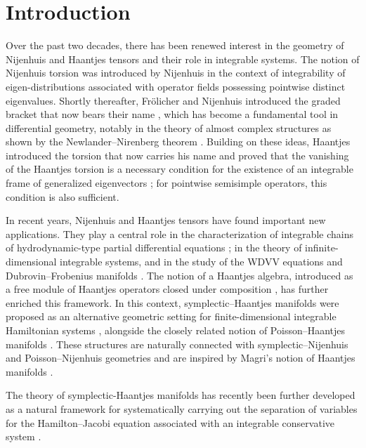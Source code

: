 \documentclass[10pt]{amsart}
\numberwithin{equation}{section}
\theoremstyle{definition}
\begin{document}
\tableofcontents



\section{Introduction}
\label{introduction}

Over the past two decades, there has been renewed interest in the geometry of Nijenhuis and Haantjes tensors and their role in integrable systems. The notion of Nijenhuis torsion was introduced by Nijenhuis \cite{Nij1951} in the context of integrability of eigen-distributions associated with operator fields possessing pointwise distinct eigenvalues. Shortly thereafter, Frölicher and Nijenhuis introduced the graded bracket that now bears their name \cite{FN1956}, which has become a fundamental tool in differential geometry, notably in the theory of almost complex structures as shown by the Newlander–Nirenberg theorem \cite{NN1957,KMS1993}. Building on these ideas, Haantjes introduced the torsion that now carries his name and proved that the vanishing of the Haantjes torsion is a necessary condition for the existence of an integrable frame of generalized eigenvectors \cite{Haa1955}; for pointwise semisimple operators, this condition is also sufficient.
\vspace{2mm}

In recent years, Nijenhuis and Haantjes tensors have found important new applications. They play a central role in the characterization of integrable chains of hydrodynamic-type partial differential equations \cite{FeMa,BogRey}; in the theory of infinite-dimensional integrable systems, and in the study of the WDVV equations and Dubrovin–Frobenius manifolds \cite{MGall13, MGall17}. The notion of a Haantjes algebra, introduced as a free module of Haantjes operators closed under composition \cite{TT2021JGP}, has further enriched this framework. In this context, symplectic--Haantjes manifolds were proposed as an alternative geometric setting for finite-dimensional integrable Hamiltonian systems \cite{TT2022AMPA}, alongside the closely related notion of Poisson--Haantjes manifolds \cite{T2018TMP}. These structures are naturally connected with symplectic–Nijenhuis \cite{MMQUAD1984, FPMPAG2003} and Poisson–Nijenhuis \cite{MMQUAD1984} geometries and are inspired by Magri’s notion of Haantjes manifolds \cite{MGall13}.
\vspace{2mm}

The theory of symplectic-Haantjes manifolds has recently been further developed as a natural framework  for systematically carrying out the separation of variables for the Hamilton--Jacobi equation associated with an integrable conservative system \cite{TT2022AMPA,RTT2022CNS,RTT2024AMPA}.
\vspace{2mm}
\end{document}
